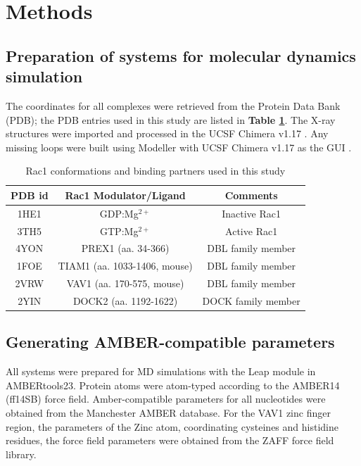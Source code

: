 \documentclass[12pt,a4paper]{achemso}
\begin{document}
\section{Methods}\label{methods}
\subsection{Preparation of systems for molecular dynamics simulation} 
The coordinates for all complexes were retrieved from the Protein Data Bank (PDB); the PDB entries used in this study are listed in \textbf{Table \ref{tbl:pdbs}}. The X-ray structures were imported and processed in the UCSF Chimera v1.17 \cite{pettersen2004ucsf}. Any missing loops were built using Modeller \cite{fiser2003modeller} with UCSF Chimera v1.17 as the GUI \cite{yang2012ucsf, huang2014enhancing}. 

\begin{table}
  \caption{Rac1 conformations and binding partners used in this study}
  \label{tbl:pdbs}
  \begin{tabular}{c c c}
    \hline
   \textbf{PDB id} & \textbf{Rac1 Modulator/Ligand} & \textbf{Comments} \\
    \hline
    1HE1\cite{gappdb} &  GDP:Mg$^{2+}$ & Inactive Rac1 \\
    3TH5\cite{activeRac1}   & GTP:Mg$^{2+}$ & Active Rac1 \\
    4YON\cite{prex1pdb} & PREX1 (aa. 34-366) &  DBL family member \\
    1FOE\cite{tiam1pdb} & TIAM1 (aa. 1033-1406, mouse) &  DBL family member \\
    2VRW\cite{vav1pdb} & VAV1 (aa. 170-575, mouse) & DBL family member \\
    2YIN\cite{dock2pdb} & DOCK2 (aa. 1192-1622) & DOCK family member \\
    \hline
  \end{tabular}
\end{table}


\subsection{Generating AMBER-compatible parameters} 
 All systems were prepared for MD simulations with the Leap module in AMBERtools23. Protein atoms were atom-typed according to the AMBER14 (ff14SB) force field\cite{ff14sb}. Amber-compatible parameters for all nucleotides were obtained from the Manchester AMBER database\cite{meagher2003development}. For the VAV1 zinc finger region, the parameters of the Zinc atom, coordinating cysteines and histidine residues, the force field parameters were obtained from the ZAFF\cite{zaff} force field library.
\end{document}
